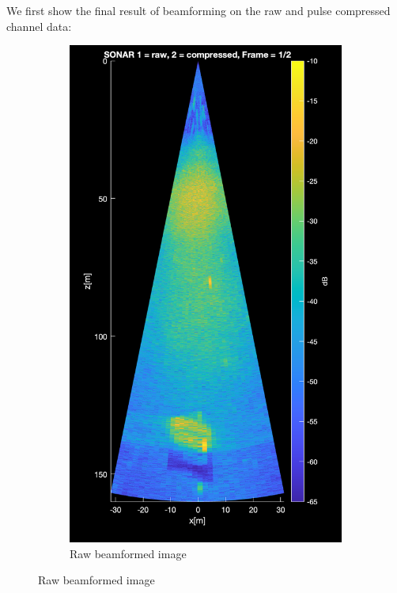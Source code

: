 \documentclass{article}
\begin{document}
\noindent We first show the final result of beamforming on the raw and pulse compressed channel data:

\begin{figure}[ht]
    \centering
    \begin{subfigure}{0.3\textwidth} %
        \centering
        \includegraphics[width=\linewidth]{b_raw.png} %
        \caption{Raw beamformed image}

\end{subfigure}
\end{figure}
\end{document}
